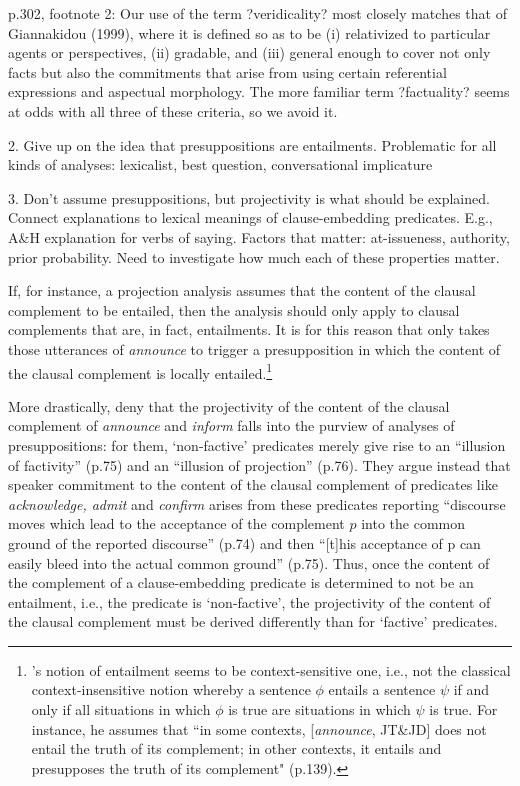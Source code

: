 \documentclass[11pt,fleqn]{article}
\newcommand{\6}{\mbox{$[\hspace*{-.6mm}[$}}
\newcommand{\9}{\mbox{$]\hspace*{-.6mm}]$}}
\newcommand{\citepos}[1]{\citeauthor{#1}'s \citeyear{#1}}
\begin{document}
{\begin{itemize}
p.302, footnote 2: Our use of the term ?veridicality? most closely matches that of Giannakidou (1999), where it is defined so as to be (i) relativized to particular agents or perspectives, (ii) gradable, and (iii) general enough to cover not only facts but also the commitments that arise from using certain referential expressions and aspectual morphology. The more familiar term ?factuality? seems at odds with all three of these criteria, so we avoid it.



2. Give up on the idea that presuppositions are entailments. Problematic for all kinds of analyses: lexicalist, best question, conversational implicature

3. Don't assume presuppositions, but projectivity is what should be explained. Connect explanations to lexical meanings of clause-embedding predicates. E.g., A\&H explanation for verbs of saying. Factors that matter: at-issueness, authority, prior probability. Need to investigate how much each of these properties matter.

\newpage


If, for instance, a projection analysis assumes that the content of the clausal complement to be entailed, then the analysis should only apply to  clausal complements that are, in fact, entailments. It is for this reason that \citet{schlenker10} only takes those utterances of {\em announce} to trigger a presupposition in which the content of the clausal complement is locally entailed.\footnote{\citepos{schlenker10} notion of entailment seems to be context-sensitive one, i.e., not the classical context-insensitive notion whereby a sentence $\phi$ entails a sentence $\psi$ if and only if all situations in which $\phi$ is true are situations in which $\psi$ is true. For instance, he assumes that ``in some contexts, [{\em announce}, JT\&JD] does not entail the truth of its complement; in other contexts, it entails and presupposes the truth of its complement" (p.139).} 

More drastically, \citet{anand-hacquard2014} deny that the projectivity of the content of the clausal complement of {\em announce} and {\em inform} falls into the purview of analyses of presuppositions: for them,  `non-factive' predicates merely give rise to an ``illusion of factivity'' (p.75) and an ``illusion of projection'' (p.76). They argue instead that speaker commitment to the content of the clausal complement of predicates like {\em acknowledge, admit} and {\em confirm} arises from these predicates reporting ``discourse moves which lead to the acceptance of the complement $p$ into the common ground of the reported discourse'' (p.74) and then ``[t]his acceptance of p can easily bleed into the actual common ground'' (p.75). Thus, once the content of the complement of a clause-embedding predicate is determined to not be an entailment, i.e., the predicate is `non-factive', the projectivity of the content of the clausal complement must be derived differently than for `factive' predicates.


\end{itemize}}
\end{document}
